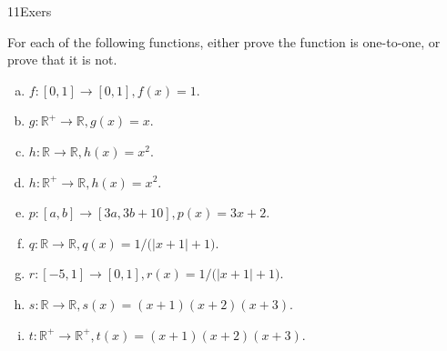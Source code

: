 \begin{exercise}{11Exers}

For each of the following functions, either prove the function is one-to-one, or prove that it is not.
 \begin{enumerate}[(a)]
\item \label{11Exers-formula-f}
\quad $f:[0,1] \rightarrow  [0,1], f(x) = 1$.
\item \label{11Exers-formula-g}
\quad $g:\mathbb{R}^+ \rightarrow  \mathbb{R}, g(x) = x$.
\item \label{11Exers-formula-h}
\quad $h:\mathbb{R} \rightarrow  \mathbb{R},h(x) = x^2$.
\item \label{11Exers-formula-j}
\quad $h:\mathbb{R}^+ \rightarrow  \mathbb{R}, h(x) = x^2$.
\item \label{11Exers-formula-p}
\quad $p:[a,b] \rightarrow  [3a,3b+10], p(x) = 3x + 2$.
\item \label{11Exers-formula-q}
\quad $q:\mathbb{R} \rightarrow  \mathbb{R}, q(x) = 1/ \bigl( |x+1| + 1 \bigr)$.
\item \label{11Exers-formula-r}
\quad $r:[-5,1] \rightarrow  [0,1], r(x) = 1/ \bigl( |x+1| + 1 \bigr)$.
\item \label{11Exers-formula-s}
\quad $s:\mathbb{R} \rightarrow  \mathbb{R}, s(x) = (x+1)(x+2)(x+3)$.
\item \label{11Exers-formula-t}
\quad $t:\mathbb{R}^+ \rightarrow  \mathbb{R}^+, t(x) = (x+1)(x+2)(x+3)$.
\end{enumerate}
\end{exercise}

